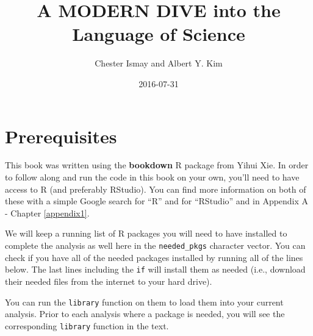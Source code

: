 \documentclass[]{tufte-book}
\title{A MODERN DIVE into the Language of Science}
\author{Chester Ismay and Albert Y. Kim}
\date{2016-07-31}
\newenvironment{Shaded}{\begin{snugshade}}{\end{snugshade}}
\newcommand{\KeywordTok}[1]{\textcolor[rgb]{0.13,0.29,0.53}{\textbf{{#1}}}}
\newcommand{\DataTypeTok}[1]{\textcolor[rgb]{0.13,0.29,0.53}{{#1}}}
\newcommand{\StringTok}[1]{\textcolor[rgb]{0.31,0.60,0.02}{{#1}}}
\newcommand{\CommentTok}[1]{\textcolor[rgb]{0.56,0.35,0.01}{\textit{{#1}}}}
\newcommand{\NormalTok}[1]{{#1}}
\begin{document}
\maketitle



{
\setcounter{tocdepth}{1}
\tableofcontents
}

\chapter{Prerequisites}\label{prereqs}

This book was written using the \textbf{bookdown} R package from Yihui
Xie. In order to follow along and run the code in this book on your own,
you'll need to have access to R (and preferably RStudio). You can find
more information on both of these with a simple Google search for ``R''
and for ``RStudio'' and in Appendix A - Chapter \ref{appendix1}.

We will keep a running list of R packages you will need to have
installed to complete the analysis as well here in the
\texttt{needed\_pkgs} character vector. You can check if you have all of
the needed packages installed by running all of the lines below. The
last lines including the \texttt{if} will install them as needed (i.e.,
download their needed files from the internet to your hard drive).

You can run the \texttt{library} function on them to load them into your
current analysis. Prior to each analysis where a package is needed, you
will see the corresponding \texttt{library} function in the text.

\begin{Shaded}
\end{Shaded}
\end{document}
